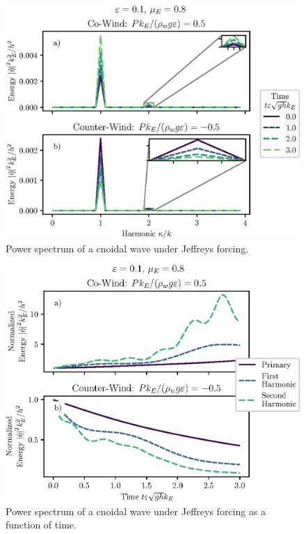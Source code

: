 \documentclass{jfm}
\begin{document}
\begin{figure}
  \centering
  \includegraphics{Power-Spectrum-Jeffreys.eps}
  \caption{
    Power spectrum of a cnoidal wave under Jeffreys forcing.
  }
\end{figure}

\begin{figure}
  \centering
  \includegraphics{Power-Spectrum-vs-Time-Jeffreys.eps}
  \caption{
    Power spectrum of a cnoidal wave under Jeffreys forcing as a function
    of time.
  }
\end{figure}
\end{document}
